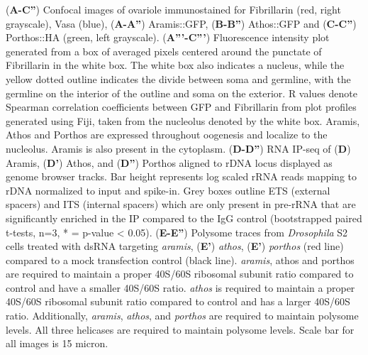 \documentclass[12pt,oneside]{reedthesis}
\begin{document}
\setlength\parindent{0pt}(\textbf{A-C''}) Confocal images of ovariole immunostained for Fibrillarin (red, right grayscale), Vasa (blue), (\textbf{A-A''}) Aramis::GFP, (\textbf{B-B''}) Athos::GFP and (\textbf{C-C''}) Porthos::HA (green, left grayscale). (\textbf{A'''-C'''}) Fluorescence intensity plot generated from a box of averaged pixels centered around the punctate of Fibrillarin in the white box. The white box also indicates a nucleus, while the yellow dotted outline indicates the divide between soma and germline, with the germline on the interior of the outline and soma on the exterior. R values denote Spearman correlation coefficients between GFP and Fibrillarin from plot profiles generated using Fiji, taken from the nucleolus denoted by the white box. Aramis, Athos and Porthos are expressed throughout oogenesis and localize to the nucleolus. Aramis is also present in the cytoplasm. (\textbf{D-D''}) RNA IP-seq of (\textbf{D}) Aramis, (\textbf{D'}) Athos, and (\textbf{D''}) Porthos aligned to rDNA locus displayed as genome browser tracks. Bar height represents log scaled rRNA reads mapping to rDNA normalized to input and spike-in. Grey boxes outline ETS (external spacers) and ITS (internal spacers) which are only present in pre-rRNA that are significantly enriched in the IP compared to the IgG control (bootstrapped paired t-tests, n=3, * = p-value \textless{} 0.05). (\textbf{E-E''}) Polysome traces from \emph{Drosophila} S2 cells treated with dsRNA targeting \emph{aramis}, (\textbf{E'}) \emph{athos}, (\textbf{E'}) \emph{porthos} (red line) compared to a mock transfection control (black line). \emph{aramis}, athos and porthos are required to maintain a proper 40S/60S ribosomal subunit ratio compared to control and have a smaller 40S/60S ratio. \emph{athos} is required to maintain a proper 40S/60S ribosomal subunit ratio compared to control and has a larger 40S/60S ratio. Additionally, \emph{aramis}, \emph{athos}, and \emph{porthos} are required to maintain polysome levels. All three helicases are required to maintain polysome levels. Scale bar for all images is 15 micron.

\setlength\parindent{24pt}

\textbf{\hfill\break
}
\end{document}
